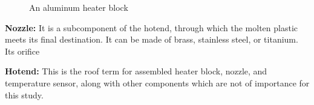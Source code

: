 \begin{figure}[H]
\begin{minipage}{0.4\textwidth}
        \caption{\small An aluminum heater block \cite{heaterblock}}
    \end{minipage}
\end{figure}

\textbf{Nozzle:} It is a subcomponent of the hotend, through which the molten plastic meets its final destination. It can be made of brass, stainless steel, or titanium. Its orifice

\textbf{Hotend:} This is the roof term for assembled heater block, nozzle, and temperature sensor, along with other components which are not of importance for this study.

